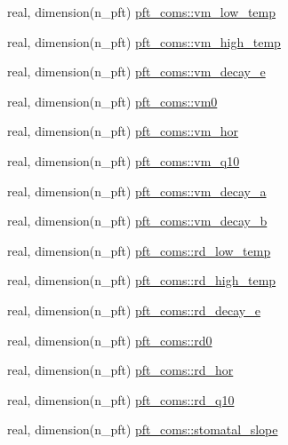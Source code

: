 \begin{DoxyCompactItemize}
real, dimension(n\+\_\+pft) \hyperlink{namespacepft__coms_abc805ab81f6ae61cf4ccfb36fd352fdc}{pft\+\_\+coms\+::vm\+\_\+low\+\_\+temp}
\item 
real, dimension(n\+\_\+pft) \hyperlink{namespacepft__coms_a847c455daab9b125944dd2057d418b6c}{pft\+\_\+coms\+::vm\+\_\+high\+\_\+temp}
\item 
real, dimension(n\+\_\+pft) \hyperlink{namespacepft__coms_a05c121e99b033c3fa874fc7ffd66fad3}{pft\+\_\+coms\+::vm\+\_\+decay\+\_\+e}
\item 
real, dimension(n\+\_\+pft) \hyperlink{namespacepft__coms_a80a6462c48a36d9c1ab7bcf0b6296702}{pft\+\_\+coms\+::vm0}
\item 
real, dimension(n\+\_\+pft) \hyperlink{namespacepft__coms_a1424943ac59ffe1e85af3d7eeca315bb}{pft\+\_\+coms\+::vm\+\_\+hor}
\item 
real, dimension(n\+\_\+pft) \hyperlink{namespacepft__coms_a47018d91ecb1fe0c547ec131348e5fdd}{pft\+\_\+coms\+::vm\+\_\+q10}
\item 
real, dimension(n\+\_\+pft) \hyperlink{namespacepft__coms_a2c9cb0165d22f8653900869b77019f4d}{pft\+\_\+coms\+::vm\+\_\+decay\+\_\+a}
\item 
real, dimension(n\+\_\+pft) \hyperlink{namespacepft__coms_a21f9c00aea9610811aae2469b5070c1b}{pft\+\_\+coms\+::vm\+\_\+decay\+\_\+b}
\item 
real, dimension(n\+\_\+pft) \hyperlink{namespacepft__coms_ad26dff15166122932a2a576c592451ba}{pft\+\_\+coms\+::rd\+\_\+low\+\_\+temp}
\item 
real, dimension(n\+\_\+pft) \hyperlink{namespacepft__coms_a1bcf4f8ef5012e5ea47b2e5deb6dae4a}{pft\+\_\+coms\+::rd\+\_\+high\+\_\+temp}
\item 
real, dimension(n\+\_\+pft) \hyperlink{namespacepft__coms_abc5e92f122fd2ebab52069105e512fa5}{pft\+\_\+coms\+::rd\+\_\+decay\+\_\+e}
\item 
real, dimension(n\+\_\+pft) \hyperlink{namespacepft__coms_a52c1f01cac447b99de69af116c709b08}{pft\+\_\+coms\+::rd0}
\item 
real, dimension(n\+\_\+pft) \hyperlink{namespacepft__coms_aa082b314a2092d3ee2b63f30cd1fc8be}{pft\+\_\+coms\+::rd\+\_\+hor}
\item 
real, dimension(n\+\_\+pft) \hyperlink{namespacepft__coms_ac49f4aa4c8e6b1ab0c02f40ac0c443bd}{pft\+\_\+coms\+::rd\+\_\+q10}
\item 
real, dimension(n\+\_\+pft) \hyperlink{namespacepft__coms_a36d072c9dc75fed2a29770bb892c0c8d}{pft\+\_\+coms\+::stomatal\+\_\+slope}
\item 

\end{DoxyCompactItemize}
